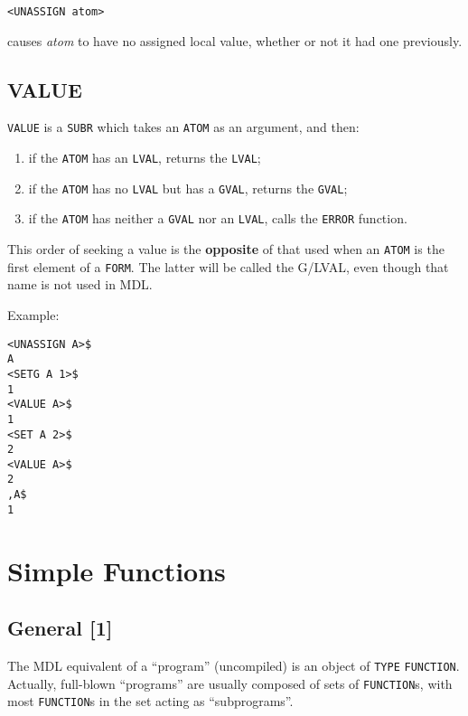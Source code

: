 \documentclass[a4paper]{scrbook}
\providecommand{\tightlist}{%
  \setlength{\itemsep}{0pt}\setlength{\parskip}{0pt}}
\begin{document}
\begin{verbatim}
<UNASSIGN atom>
\end{verbatim}

 causes \emph{atom} to have no assigned local value, whether or not it had one previously.

\section{VALUE}\label{value}

\texttt{VALUE} is a \texttt{SUBR} which takes an \texttt{ATOM} as an argument, and then:

\begin{enumerate}
\def\labelenumi{\arabic{enumi}.}
\tightlist
\item
  if the \texttt{ATOM} has an \texttt{LVAL}, returns the \texttt{LVAL};
\item
  if the \texttt{ATOM} has no \texttt{LVAL} but has a \texttt{GVAL}, returns the \texttt{GVAL};
\item
  if the \texttt{ATOM} has neither a \texttt{GVAL} nor an \texttt{LVAL}, calls the \texttt{ERROR} function.
\end{enumerate}

This order of seeking a value is the \textbf{opposite} of that used when an \texttt{ATOM} is the first element of a
\texttt{FORM}. The latter will be called the G/LVAL, even though that name is not used in MDL.

Example:

\begin{verbatim}
<UNASSIGN A>$
A
<SETG A 1>$
1
<VALUE A>$
1
<SET A 2>$
2
<VALUE A>$
2
,A$
1
\end{verbatim}

\chapter{Simple Functions}\label{chapter-5.-simple-functions}

\section{General {[}1{]}}\label{general-1-2}

The MDL equivalent of a ``program'' (uncompiled) is an object of \texttt{TYPE}
\texttt{FUNCTION}. Actually, full-blown ``programs'' are usually composed of sets of
\texttt{FUNCTION}s, with most \texttt{FUNCTION}s in the set acting as ``subprograms''.
\end{document}
